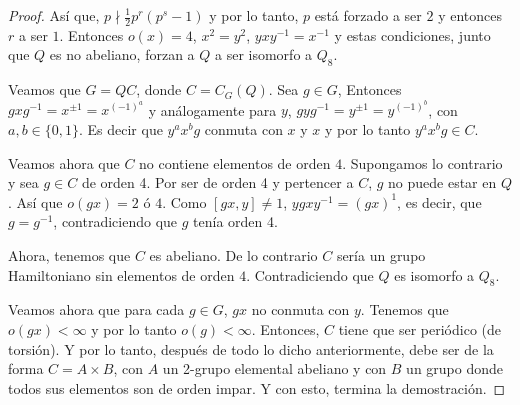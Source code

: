 \begin{proof}
    Así que, $p \nmid \frac{1}{2} p^r(p^s - 1)$ y por lo tanto, $p$ está forzado a ser $2$ y entonces 
    $r$ a ser $1$. Entonces $o(x) = 4$, $x^2 = y^2$, $yxy^{-1} = x^{-1}$ y estas condiciones, junto que $Q$ es no abeliano, 
    forzan a $Q$ a ser isomorfo a $Q_8$.\pn
    
    Veamos que $G = QC$, donde $C = C_G(Q)$. Sea $g \in G$, Entonces $gxg^{-1} = x^{\pm 1} = x^{(-1)^a}$ y análogamente para $y$,
    $gyg^{-1} = y^{\pm 1} = y^{(-1)^b}$, con $a,b \in \{0, 1\}$. Es decir que $y^a x^b g$ conmuta con $x$ y $x$ y por lo tanto
    $y^a x^b g \in C$.\pn
    
    Veamos ahora que $C$ no contiene elementos de orden $4$. Supongamos lo contrario y sea $g \in C$ de orden 4. Por ser de
    orden 4 y pertencer a $C$, $g$ no puede estar en $Q$. Así que $o(gx) = 2$ ó $4$. Como $[gx, y] \neq 1$, $ygxy^{-1} = (gx)^1$, es
    decir, que $g = g^{-1}$, contradiciendo que $g$ tenía orden 4.\pn
    
    Ahora, tenemos que $C$ es abeliano. De lo contrario $C$ sería un grupo Hamiltoniano sin elementos de orden $4$. Contradiciendo que
    $Q$ es isomorfo a $Q_8$.\pn
    
    Veamos ahora que para cada $g \in G$, $gx$ no conmuta con $y$. Tenemos que $o(gx) < \infty$ y por lo tanto $o(g) < \infty$. Entonces, $C$
    tiene que ser periódico (de torsión). Y por lo tanto, después de todo lo dicho anteriormente, debe ser de la forma $C = A \times B$,
    con $A$ un 2-grupo elemental abeliano y con $B$ un grupo donde todos sus elementos son de orden impar. Y con esto, termina la demostración.
\end{proof}
